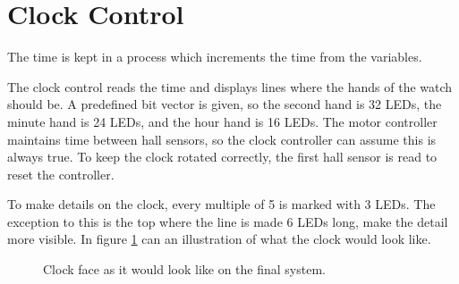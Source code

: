 \section{Clock Control}
The time is kept in a process which increments the time from the variables.

The clock control reads the time and displays lines where the hands of the watch should be.
A predefined bit vector is given, so the second hand is 32 LEDs, the minute hand is 24 LEDs, and the hour hand is 16 LEDs.
The motor controller maintains time between hall sensors, so the clock controller can assume this is always true.
To keep the clock rotated correctly, the first hall sensor is read to reset the controller.

To make details on the clock, every multiple of 5 is marked with 3 LEDs.
The exception to this is the top where the line is made 6 LEDs long, make the detail more visible.
In figure \ref{fig:clock_face} can an illustration of what the clock would look like.

\begin{figure}[h]
\centering
{}
 \caption{Clock face as it would look like on the final system.}
 \label{fig:clock_face}
\end{figure}